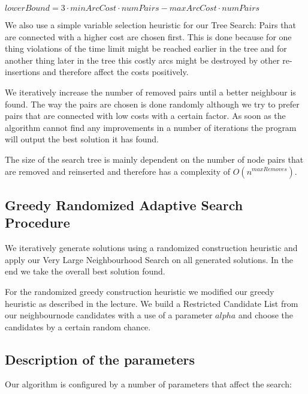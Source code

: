 \documentclass[a4paper]{scrartcl}
\begin{document}
$lowerBound = 3 \cdot minArcCost \cdot numPairs - maxArcCost \cdot numPairs$

We also use a simple variable selection heuristic for our Tree Search: Pairs that are connected with a higher cost are chosen first. This is done because for one thing violations of the time limit might be reached earlier in the tree and for another thing later in the tree this costly arcs might be destroyed by other re-insertions and therefore affect the costs positively.

We iteratively increase the number of removed pairs until a better neighbour is found. The way the pairs are chosen is done randomly although we try to prefer pairs that are connected with low costs with a certain factor. As soon as the algorithm cannot find any improvements in a number of iterations the program will output the best solution it has found.

The size of the search tree is mainly dependent on the number of node pairs that are removed and reinserted and therefore has a complexity of $O(n^{maxRemoves})$.

\subsection{Greedy Randomized Adaptive Search Procedure}
We iteratively generate solutions using a randomized construction heuristic and apply our Very Large Neighbourhood Search on all generated solutions. In the end we take the overall best solution found.

For the randomized greedy construction heuristic we modified our greedy heuristic as described in the lecture. We build a Restricted Candidate List from our neighbournode candidates with a use of a parameter $alpha$ and choose the candidates by a certain random chance.

\subsection{Description of the parameters}
Our algorithm is configured by a number of parameters that affect the search:
\end{document}
